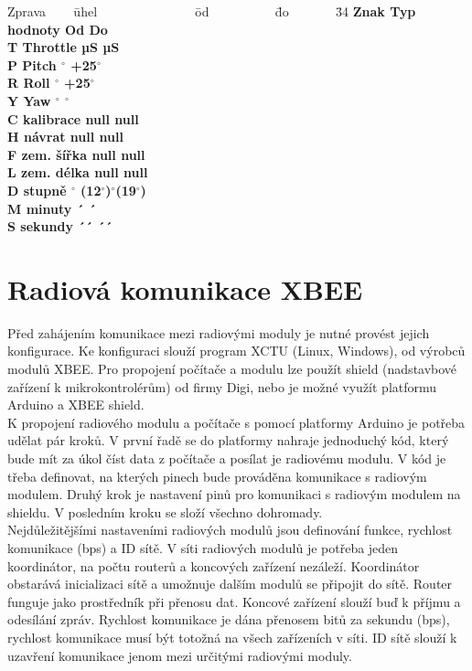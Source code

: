 \begin{tabbing}
	Zprava ~~~ \= uhel ~~~~~~~~~~~~~~ \= od ~~~~~~~~~ \= do ~~~~~~
	\= 34 \kill
	\bfseries Znak \>
	\bfseries Typ hodnoty \>
	\bfseries Od \>
	\bfseries Do \\
	T\> Throttle  µS  µS \\
	P\> Pitch $^\circ$ \> +25$^\circ$   \\
	R\> Roll $^\circ$ \> +25$^\circ$ \\
	Y\> Yaw $^\circ$ $^\circ$ \\
	C\> kalibrace \> null \> null \\
	H\> návrat \> null \> null \\
	F\> zem. šířka \> null \> null \\
	L\> zem. délka \> null \> null \\
	D\> stupně $^\circ$ (12$^\circ$)$^\circ$(19$^\circ$) \\
	M\> minuty ´ ´ \\
	S\> sekundy ´´ ´´ \\
	
\end{tabbing}

\section{Radiová komunikace XBEE}
Před zahájením komunikace mezi radiovými moduly je nutné provést jejich konfigurace. Ke konfiguraci slouží program XCTU (Linux, Windows), od výrobců modulů XBEE. Pro propojení počítače a modulu lze použít shield (nadstavbové zařízení k mikrokontrolérům) od firmy Digi, nebo je možné využít platformu Arduino a XBEE shield.\\
K propojení radiového modulu a počítače s pomocí platformy Arduino je potřeba udělat pár kroků. V první řadě se do platformy nahraje jednoduchý kód, který bude mít za úkol číst data z počítače a posílat je radiovému modulu. V kód je třeba definovat, na kterých pinech bude prováděna komunikace s radiovým modulem. Druhý krok je nastavení pinů pro komunikaci s radiovým modulem na shieldu. V posledním kroku se složí všechno dohromady.\\
Nejdůležitějšími nastaveními radiových modulů jsou definování funkce, rychlost komunikace (bps) a ID sítě. V síti radiových modulů je potřeba jeden koordinátor, na počtu routerů a koncových zařízení nezáleží. Koordinátor obstarává inicializaci sítě a umožnuje dalším modulů se připojit do sítě. Router funguje jako prostředník při přenosu dat. Koncové zařízení slouží buď k příjmu a odesílání zpráv. Rychlost komunikace je dána přenosem bitů za sekundu (bps), rychlost komunikace musí být totožná na všech zařízeních v síti. ID sítě slouží k uzavření komunikace jenom mezi určitými radiovými moduly.\\

